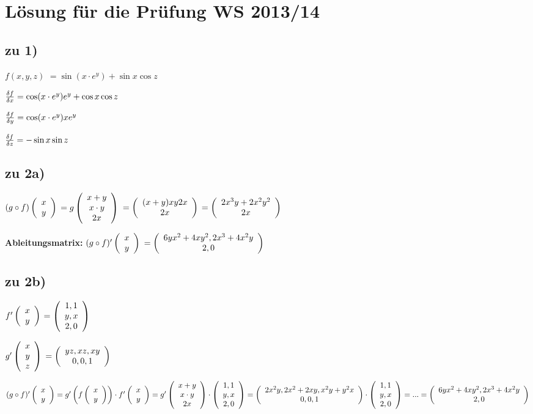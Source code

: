 \renewcommand{\ldate}{2015-12-17}


\section{Lösung für die Prüfung WS 2013/14}

\subsection{zu 1)}
$f(x,y,z)$
$ =\sin(x\cdot e^y) + \sin x \cos z$

$ \frac{\df}{\dx} = \cos (x\cdot e^y) e^y + \cos x \cos z$

$ \frac{\df}{\dy} = \cos (x\cdot e^y) x e^y $

$ \frac{\df}{\dz} = -\sin x \sin z$

\subsection{zu 2a)}
$ (g\circ f) \vektor{x\\y} $
$= g\vektor{x+y\\x\cdot y\\2x}$
$=\vektor{(x+y) x y 2 x \\ 2x}$
$=\vektor{2x^3y + 2x^2y^2\\2x}$

\textbf{Ableitungsmatrix:}
$ (g\circ f)' \vektor{x\\y} $
$=\vektor{6yx^2 + 4xy^2, 2x^3 + 4x^2y\\2, 0}$

\subsection{zu 2b)}
$f'\vektor{x\\y}$
$=\vektor{1,1\\y,x\\2,0}$

$g'\vektor{x\\y\\z}$
$=\vektor{yz, xz, xy\\0,0,1}$

$
(g\circ f)' \vektor{x\\y} 
=g' \rbr{f \vektor{x\\y}}  \cdot f'\vektor{x\\y}
=g'\vektor{x+y\\x\cdot y\\2x}  \cdot \vektor{1,1\\y,x\\2,0} 
=\vektor{2x^2y, 2x^2+2xy,x^2y+y^2x\\0,0,1} \cdot \vektor{1,1\\y,x\\2,0} 
=...=\vektor{6yx^2 + 4xy^2, 2x^3+4x^2y\\2,0}
$


